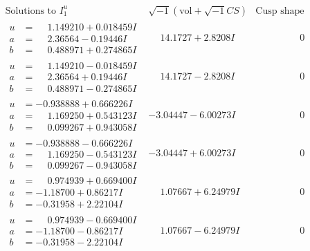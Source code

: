 \documentclass[1p]{elsarticle_modified}
\theoremstyle{definition}
\newcommand{\I}{\sqrt{-1}}
\begin{document}
$$\begin{array}{c|c|c}
 \end{array}$$\newpage$$\begin{array}{c|c|c}  
\text{Solutions to }I^u_{1}& \I (\text{vol} + \sqrt{-1}CS) & \text{Cusp shape}\\
 \hline 
\begin{aligned}
u &= \phantom{-}1.149210 + 0.018459 I \\
a &= \phantom{-}2.36564 - 0.19446 I \\
b &= \phantom{-}0.488971 + 0.274865 I\end{aligned}
 & \phantom{-}14.1727 + 2.8208 I & \phantom{-0.000000 } 0 \\ \hline\begin{aligned}
u &= \phantom{-}1.149210 - 0.018459 I \\
a &= \phantom{-}2.36564 + 0.19446 I \\
b &= \phantom{-}0.488971 - 0.274865 I\end{aligned}
 & \phantom{-}14.1727 - 2.8208 I & \phantom{-0.000000 } 0 \\ \hline\begin{aligned}
u &= -0.938888 + 0.666226 I \\
a &= \phantom{-}1.169250 + 0.543123 I \\
b &= \phantom{-}0.099267 + 0.943058 I\end{aligned}
 & -3.04447 - 6.00273 I & \phantom{-0.000000 } 0 \\ \hline\begin{aligned}
u &= -0.938888 - 0.666226 I \\
a &= \phantom{-}1.169250 - 0.543123 I \\
b &= \phantom{-}0.099267 - 0.943058 I\end{aligned}
 & -3.04447 + 6.00273 I & \phantom{-0.000000 } 0 \\ \hline\begin{aligned}
u &= \phantom{-}0.974939 + 0.669400 I \\
a &= -1.18700 + 0.86217 I \\
b &= -0.31958 + 2.22104 I\end{aligned}
 & \phantom{-}1.07667 + 6.24979 I & \phantom{-0.000000 } 0 \\ \hline\begin{aligned}
u &= \phantom{-}0.974939 - 0.669400 I \\
a &= -1.18700 - 0.86217 I \\
b &= -0.31958 - 2.22104 I\end{aligned}
 & \phantom{-}1.07667 - 6.24979 I & \phantom{-0.000000 } 0 \\ \hline\begin{aligned}

\end{aligned}
\end{array}$$
\end{document}
